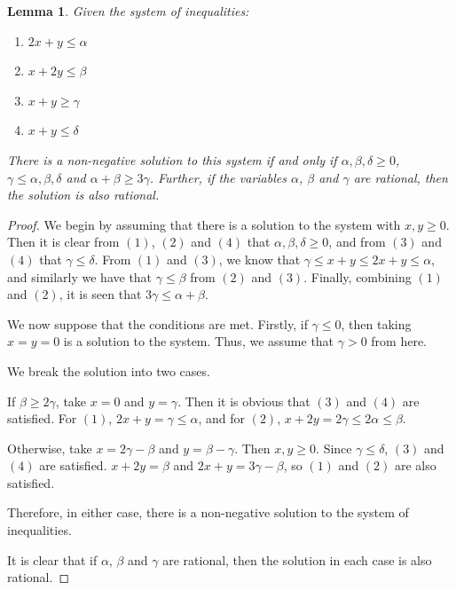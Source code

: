\documentclass[preprint,nonatbib]{elsarticle}
\newtheorem{lemma}[theorem]{Lemma}
\theoremstyle{definition}
\numberwithin{equation}{section}
\begin{document}
\begin{lemma}
\label{lemma: h_1h_2^ah_3^b inequality system solution}
    Given the system of inequalities:
    \begin{enumerate}[label=\textup{(\arabic*)}]
        \item $2x+y\leq \alpha$
        \item $x+2y\leq \beta$
        \item $x+y\geq \gamma$
        \item $x+y\leq \delta$
    \end{enumerate}
    There is a non-negative solution to this system if and only if $\alpha,\beta,\delta\geq 0$, $\gamma\leq \alpha,\beta,\delta$ and $\alpha+\beta\geq 3\gamma$. Further, if the variables $\alpha$, $\beta$ and $\gamma$ are rational, then the solution is also rational.
\end{lemma}
\begin{proof}
    We begin by assuming that there is a solution to the system with $x,y\geq 0$. Then it is clear from $(1)$, $(2)$ and $(4)$ that $\alpha,\beta,\delta\geq 0$, and from $(3)$ and $(4)$ that $\gamma\leq \delta$. From $(1)$ and $(3)$, we know that $\gamma\leq x+y\leq 2x+y\leq \alpha$, and similarly we have that $\gamma\leq \beta$ from $(2)$ and $(3)$. Finally, combining $(1)$ and $(2)$, it is seen that $3\gamma\leq \alpha+\beta$.

    We now suppose that the conditions are met. Firstly, if $\gamma\leq 0$, then taking $x=y=0$ is a solution to the system. Thus, we assume that $\gamma>0$ from here.
    
    We break the solution into two cases.

    If $\beta\geq 2\gamma$, take $x=0$ and $y=\gamma$. Then it is obvious that $(3)$ and $(4)$ are satisfied. For $(1)$, $2x+y = \gamma\leq \alpha$, and for $(2)$, $x+2y = 2\gamma \leq 2\alpha\leq \beta$.

    Otherwise, take $x=2\gamma - \beta$ and $y=\beta - \gamma$. Then $x,y\geq 0$. Since $\gamma\leq \delta$, $(3)$ and $(4)$ are satisfied. $x+2y = \beta$ and $2x+y = 3\gamma-\beta$, so $(1)$ and $(2)$ are also satisfied.

    Therefore, in either case, there is a non-negative solution to the system of inequalities.

    It is clear that if $\alpha$, $\beta$ and $\gamma$ are rational, then the solution in each case is also rational.
\end{proof}
\end{document}
